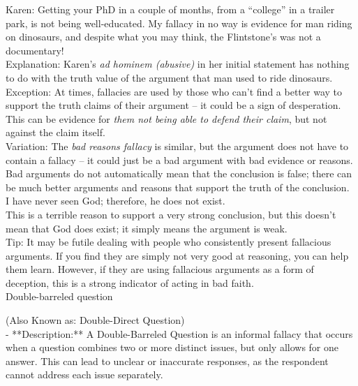 \documentclass[a4paper,12pt,single,pdftex]{scrartcl}
\begin{document}
    
      Karen:  Getting your PhD in a couple of months, from a “college” in a trailer park, is not being well-educated.  My fallacy in no way is evidence for man riding on dinosaurs, and despite what you may think, the Flintstone’s was not a documentary!
    \\

    
      Explanation: Karen’s {\it ad hominem (abusive)} in her initial statement has nothing to do with the truth value of the argument that man used to ride dinosaurs.
    \\

    
      Exception: At times, fallacies are used by those who can’t find a better way to support the truth claims of their argument -- it could be a sign of desperation.  This can be evidence for {\it them not being able to defend their claim}, but not against the claim itself.
    \\

    
      Variation: The {\it bad reasons fallacy} is similar, but the argument does not have to contain a fallacy -- it could just be a bad argument with bad evidence or reasons.  Bad arguments do not automatically mean that the conclusion is false; there can be much better arguments and reasons that support the truth of the conclusion.
    \\

    
      I have never seen God; therefore, he does not exist.
    \\

    
      This is a terrible reason to support a very strong conclusion, but this doesn’t mean that God does exist; it simply means the argument is weak.
    \\

    
      Tip: It may be futile dealing with people who consistently present fallacious arguments. If you find they are simply not very good at reasoning, you can help them learn. However, if they are using fallacious arguments as a form of deception, this is a strong indicator of acting in bad faith.
    \\

  

Double-barreled question
    
      (Also Known as: Double-Direct Question)
    \\

  
    
      - **Description:** A Double-Barreled Question is an informal fallacy that occurs when a question combines two or more distinct issues, but only allows for one answer. This can lead to unclear or inaccurate responses, as the respondent cannot address each issue separately.
    \\
\end{document}
